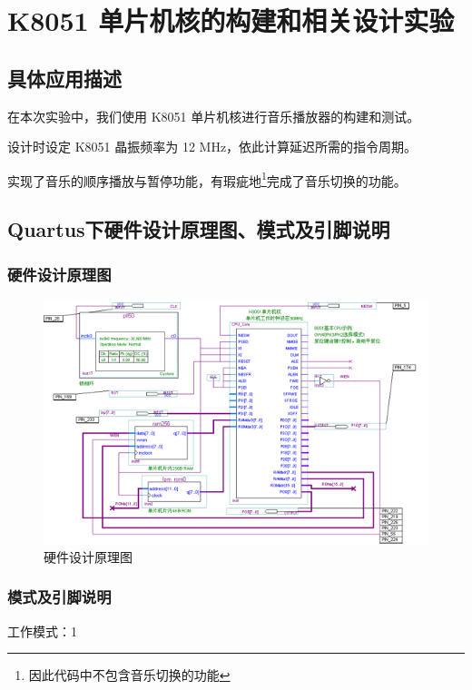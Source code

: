 \chapter{ K8051 单片机核的构建和相关设计实验}

\section{具体应用描述}

在本次实验中，我们使用 K8051 单片机核进行音乐播放器的构建和测试。

设计时设定 K8051 晶振频率为 12 MHz，依此计算延迟所需的指令周期。

实现了音乐的顺序播放与暂停功能，有瑕疵地\footnote{因此代码中不包含音乐切换的功能}完成了音乐切换的功能。

\section{Quartus下硬件设计原理图、模式及引脚说明}

\subsection{硬件设计原理图}

\begin{figure}[H]
\centering
\includegraphics[width=\textwidth]{images/prin7.png}
\caption{硬件设计原理图}
\label{fig:prin7}
\end{figure}

\subsection{模式及引脚说明}

工作模式：1

